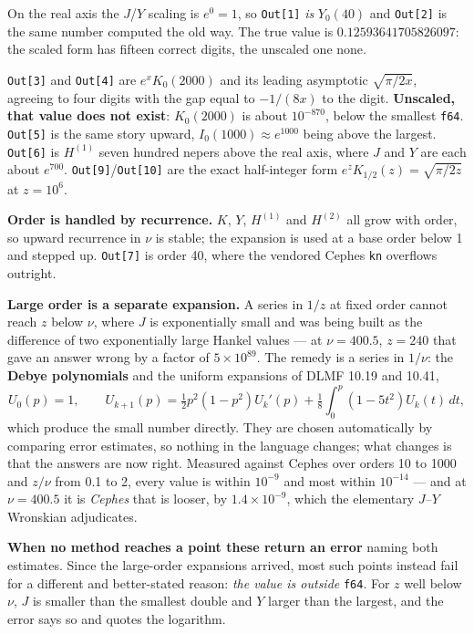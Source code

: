 \documentclass[11pt]{article}
\newcommand{\code}[1]{\texttt{#1}}
\begin{document}
On the real axis the $J$/$Y$ scaling is $e^0 = 1$, so \code{Out[1]}
\emph{is} $Y_0(40)$ and \code{Out[2]} is the same number computed the
old way. The true value is $0.12593641705826097$: the scaled form has
fifteen correct digits, the unscaled one none.

\code{Out[3]} and \code{Out[4]} are $e^xK_0(2000)$ and its leading
asymptotic $\sqrt{\pi/2x}$, agreeing to four digits with the gap equal
to $-1/(8x)$ to the digit. \textbf{Unscaled, that value does not
exist}: $K_0(2000)$ is about $10^{-870}$, below the smallest \code{f64}.
\code{Out[5]} is the same story upward, $I_0(1000) \approx e^{1000}$
being above the largest. \code{Out[6]} is $H^{(1)}$ seven hundred nepers
above the real axis, where $J$ and $Y$ are each about $e^{700}$.
\code{Out[9]}/\code{Out[10]} are the exact half-integer form
$e^{z}K_{1/2}(z) = \sqrt{\pi/2z}$ at $z = 10^{6}$.

\textbf{Order is handled by recurrence.} $K$, $Y$, $H^{(1)}$ and
$H^{(2)}$ all grow with order, so upward recurrence in $\nu$ is stable;
the expansion is used at a base order below 1 and stepped up.
\code{Out[7]} is order 40, where the vendored Cephes \code{kn} overflows
outright.

\textbf{Large order is a separate expansion.} A series in $1/z$ at fixed
order cannot reach $z$ below $\nu$, where $J$ is exponentially small and
was being built as the difference of two exponentially large Hankel
values --- at $\nu = 400.5$, $z = 240$ that gave an answer wrong by a
factor of $5\times10^{89}$. The remedy is a series in $1/\nu$: the
\textbf{Debye polynomials} and the uniform expansions of DLMF 10.19 and
10.41,
\[
  U_0(p) = 1,\qquad
  U_{k+1}(p) = \tfrac12 p^2(1-p^2)U_k'(p)
             + \tfrac18\int_0^p (1-5t^2)U_k(t)\,dt,
\]
which produce the small number directly. They are chosen automatically
by comparing error estimates, so nothing in the language changes; what
changes is that the answers are now right. Measured against Cephes over
orders 10 to 1000 and $z/\nu$ from 0.1 to 2, every value is within
$10^{-9}$ and most within $10^{-14}$ --- and at $\nu = 400.5$ it is
\emph{Cephes} that is looser, by $1.4\times10^{-9}$, which the
elementary $J$--$Y$ Wronskian adjudicates.

\textbf{When no method reaches a point these return an error} naming
both estimates. Since the large-order expansions arrived, most such
points instead fail for a different and better-stated reason: \emph{the
value is outside} \code{f64}. For $z$ well below $\nu$, $J$ is smaller
than the smallest double and $Y$ larger than the largest, and the error
says so and quotes the logarithm.
\end{document}
